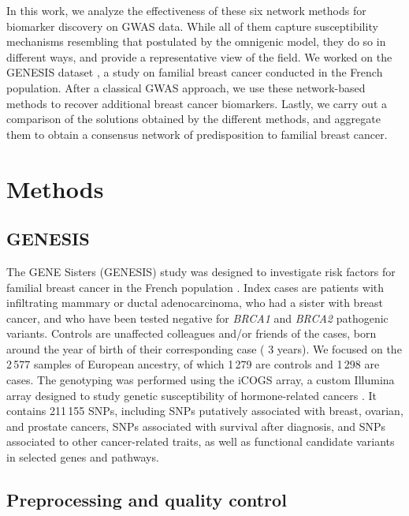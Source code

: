 \documentclass[twocolumn, 11pt]{article}
\begin{document}
In this work, we analyze the effectiveness of these six network methods for biomarker discovery on GWAS data. While all of them capture susceptibility mechanisms resembling that postulated by the omnigenic model, they do so in different ways, and provide a representative view of the field. We worked on the GENESIS dataset \cite{sinilnikova_genesis:_2016}, a study on familial breast cancer conducted in the French population. After a classical GWAS approach, we use these network-based methods to recover additional breast cancer biomarkers. Lastly, we carry out a comparison of the solutions obtained by the different methods, and aggregate them to obtain a consensus network of predisposition to familial breast cancer. 

\section{Methods}
\subsection{GENESIS}

The GENE Sisters (GENESIS) study was designed to investigate risk factors for familial breast cancer in the French population \cite{sinilnikova_genesis:_2016}. Index cases are patients with infiltrating mammary or ductal adenocarcinoma, who had a sister with breast cancer, and who have been tested negative for \emph{BRCA1} and \emph{BRCA2} pathogenic variants. Controls are unaffected colleagues and/or friends of the cases, born around the year of birth of their corresponding case (\textpm{} 3 years). We focused on the 2\,577 samples of European ancestry, of which 1\,279 are controls and 1\,298 are cases. The genotyping was performed using the iCOGS array, a custom Illumina array designed to study genetic susceptibility of hormone-related cancers \cite{sakoda_turning_2013}. It contains 211\,155 SNPs, including SNPs putatively associated with breast, ovarian, and prostate cancers, SNPs associated with survival after diagnosis, and SNPs associated to other cancer-related traits, as well as functional candidate variants in selected genes and pathways.

\subsection{Preprocessing and quality control}
\end{document}
